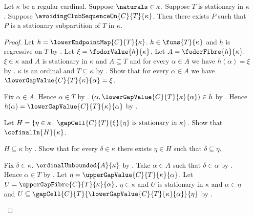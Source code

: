 \begin{theorem}\label{avoiding_club_sequence_stationary_subpartition}
    Let $\kappa$ be a regular cardinal.
    Suppose $\naturals\in\kappa$.
    Suppose $T$ is stationary in $\kappa$.
    Suppose $\avoidingClubSequenceOn{C}{T}{\kappa}$.
    Then there exists $P$ such that
        $P$ is a stationary subpartition of $T$ in $\kappa$.
\end{theorem}
\begin{proof}
    Let $h=\lowerEndpointMap{C}{T}{\kappa}$.
    $h\in\funs{T}{\kappa}$ and $h$ is regressive on $T$
        by .
    Let $\xi=\fodorValue{h}{\kappa}$.
    Let $A=\fodorFibre{h}{\kappa}$.
    $\xi\in\kappa$ and $A$ is stationary in $\kappa$ and
        $A\subseteq T$ and
        for every $\alpha\in A$ we have $h(\alpha)=\xi$
        by .
    $\kappa$ is an ordinal and $T\subseteq\kappa$
        by .
    Show that for every $\alpha\in A$ we have
        $\lowerGapValue{C}{T}{\kappa}{\alpha}=\xi$.
    \begin{subproof}
        Fix $\alpha\in A$.
        Hence $\alpha\in T$ by .
        $(\alpha,\lowerGapValue{C}{T}{\kappa}{\alpha})\in h$
            by .
        Hence $h(\alpha)=\lowerGapValue{C}{T}{\kappa}{\alpha}$
            by .
    \end{subproof}
    Let $H=\{\eta\in\kappa\mid
        \text{$\gapCell{C}{T}{\xi}{\eta}$ is stationary in $\kappa$}\}$.
    Show that $\cofinalIn{H}{\kappa}$.
    \begin{subproof}
        $H\subseteq\kappa$ by .
        Show that for every $\delta\in\kappa$ there exists $\eta\in H$
            such that $\delta\subseteq\eta$.
        \begin{subproof}
            Fix $\delta\in\kappa$.
            $\ordinalUnbounded{A}{\kappa}$
                by .
            Take $\alpha\in A$ such that $\delta\in\alpha$
                by .
            Hence $\alpha\in T$ by .
            Let $\eta=\upperGapValue{C}{T}{\kappa}{\alpha}$.
            Let $U=\upperGapFibre{C}{T}{\kappa}{\alpha}$.
            $\eta\in\kappa$ and $U$ is stationary in $\kappa$ and
                $\alpha\in\eta$ and
                $U\subseteq\gapCell{C}{T}
                    {\lowerGapValue{C}{T}{\kappa}{\alpha}}{\eta}$
                by .

\end{subproof}
\end{subproof}
\end{proof}
